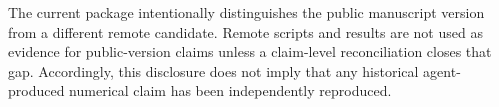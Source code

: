 The current package intentionally distinguishes the public manuscript version
from a different remote candidate. Remote scripts and results are not used as
evidence for public-version claims unless a claim-level reconciliation closes
that gap. Accordingly, this disclosure does not imply that any historical
agent-produced numerical claim has been independently reproduced.
